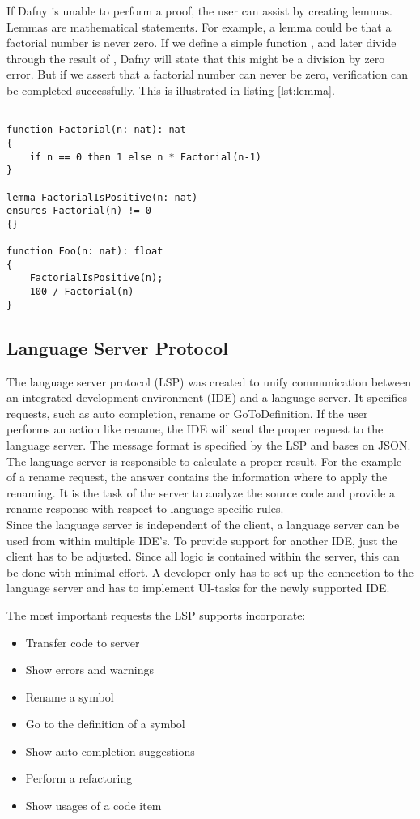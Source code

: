 If Dafny is unable to perform a proof, the user can assist by creating lemmas.
Lemmas are mathematical statements.
For example, a lemma could be that a factorial number is never zero.
If we define a simple function , and later divide through the result of , Dafny will state that this might be a division by zero error.
But if we assert that a factorial number can never be zero, verification can be completed successfully.
This is illustrated in listing \ref{lst:lemma}.
\begin{lstlisting}[language=dafny, caption={Lemmas}, captionpos=b, label={lst:lemma}]

function Factorial(n: nat): nat
{
    if n == 0 then 1 else n * Factorial(n-1)
}

lemma FactorialIsPositive(n: nat)
ensures Factorial(n) != 0
{}

function Foo(n: nat): float
{
    FactorialIsPositive(n);
    100 / Factorial(n)
}
\end{lstlisting}

\subsection{Language Server Protocol}
The language server protocol (LSP) was created to unify communication between an integrated development environment (IDE) and a language server.
It specifies requests, such as auto completion, rename or GoToDefinition.
If the user performs an action like rename, the IDE will send the proper request to the language server.
The message format is specified by the LSP and bases on JSON.\\

The language server is responsible to calculate a proper result.
For the example of a rename request, the answer contains the information where to apply the renaming.
It is the task of the server to analyze the source code and provide a rename response with respect to language specific rules.\\

Since the language server is independent of the client, a language server can be used from within multiple IDE's.
To provide support for another IDE, just the client has to be adjusted.
Since all logic is contained within the server, this can be done with minimal effort.
A developer only has to set up the connection to the language server and has to implement UI-tasks for the newly supported IDE.

The most important requests the LSP supports incorporate:
\begin{itemize}
    \item Transfer code to server
    \item Show errors and warnings
    \item Rename a symbol
    \item Go to the definition of a symbol
    \item Show auto completion suggestions
    \item Perform a refactoring
    \item Show usages of a code item
\end{itemize}

